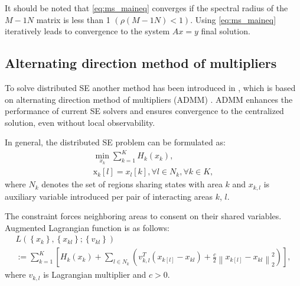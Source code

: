 It should be noted that \ref{eq:ms_maineq} converges if the spectral radius of the \(M-1N\) matrix is less than 1 \((\rho(M-1N) < 1)\). Using \ref{eq:ms_maineq} iteratively leads to convergence to the system \(Ax = y\) final solution.

\subsection{Alternating direction method of multipliers}\label{subsec:ch1/sec4/sub6}
To solve distributed SE another method has been introduced in \autocite{6340375}, which is based on alternating direction method of multipliers (ADMM) \autocite{boyd2004convex}. ADMM enhances the performance of current SE solvers and ensures convergence to the centralized solution, even without local observability.


In general, the distributed SE problem can be formulated as:
\begin{equation}
    \begin{array}{c}
\min _{x_{k}} \sum_{k=1}^{K} H_{k}\left(x_{k}\right), \\
\mathrm{x}_{k}[l]=x_{l}[k], \forall l \in N_{k}, \forall k \in K,
\end{array}
\end{equation}
where $N_k$ denotes the set of regions sharing states with area $k$ and $x_{k,l}$ is auxiliary variable introduced per pair of interacting areas $k$, $l$.

The constraint forces neighboring areas to consent on their shared variables. Augmented Lagrangian function is as follows:
\begin{equation}
    \begin{array}{c}
L\left(\left\{x_{k}\right\},\left\{x_{k l}\right\} ;\left\{v_{k l}\right\}\right) \\
:=\sum_{k=1}^{K}\left[H_{k}\left(x_{k}\right)+\sum_{l \in N_{k}}\left(v_{k, l}^{T}\left(x_{k[l]}-x_{k l}\right)+\frac{c}{2}\left\|x_{k[l]}-x_{k l}\right\|_{2}^{2}\right)\right],
\end{array}
\end{equation}
where $v_{k,l}$ is Lagrangian multiplier and \(c > 0\).


